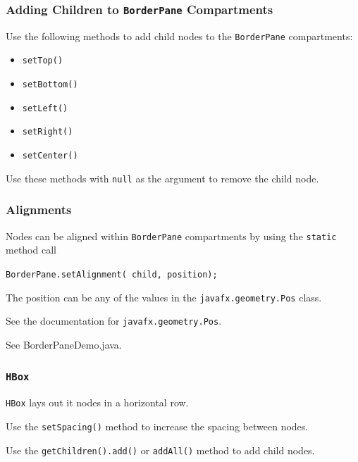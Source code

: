 \documentclass{beamer}
\newcommand{\mil}[1]{\texttt{#1}}
\begin{document}
\begin{frame}

    \frametitle{Adding Children to \mil{BorderPane} Compartments}
    
    Use the following methods to add child nodes to the \mil{BorderPane} compartments:
    
    \begin{itemize}
        \item \mil{setTop()}
        \item \mil{setBottom()}
        \item \mil{setLeft()}
        \item \mil{setRight()}
        \item \mil{setCenter()}
    \end{itemize}
    
    \bigskip
    
    Use these methods with \mil{null} as the argument to remove the child node.
\end{frame}

\begin{frame}
    
    \frametitle{Alignments}
    
    Nodes can be aligned within \mil{BorderPane} compartments by using the \mil{static} method call
    
    \bigskip
    
    \mil{BorderPane.setAlignment( child, position);}
    
    \bigskip
    
    The position can be any of the values in the \mil{javafx.geometry.Pos} class.
    
    \bigskip
    
    See the documentation for \mil{javafx.geometry.Pos}.
    
    \bigskip
    
    See BorderPaneDemo.java.
    
\end{frame}

\begin{frame}
    
    \frametitle{\mil{HBox}}
    
    \mil{HBox} lays out it nodes in a horizontal row.
    
    \bigskip
    
    Use the \mil{setSpacing()} method to increase the spacing between nodes.
    
    \bigskip
    
    Use the \mil{getChildren().add()} or \mil{addAll()} method to add child nodes.
\end{frame}
\end{document}
